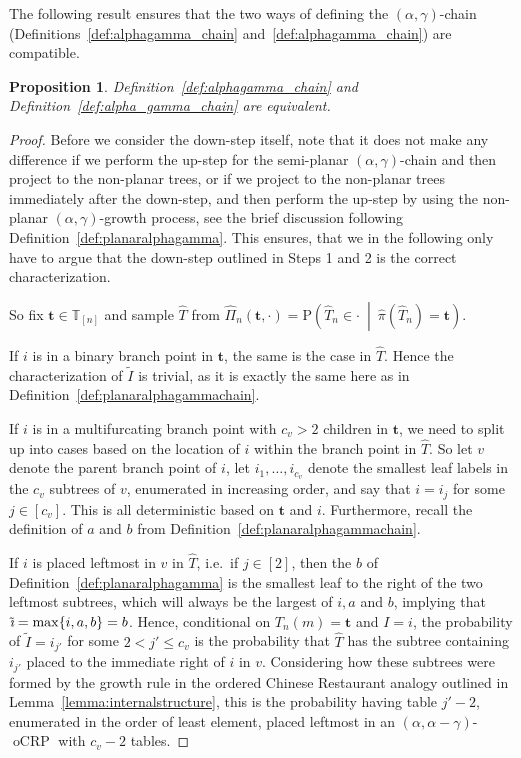 \documentclass[a4paper, final]{amsart}
\theoremstyle{plain}
\newtheorem{prop}[thm]{Proposition}
\theoremstyle{definition}
\newcommand{\tree}[1][t]{\boldsymbol{#1}}
\newcommand{\That}[1][T]{\widehat{#1}}
\newcommand{\T}{\mathbb{T}}
\DeclareMathOperator{\tildei}{\tilde{\textit{\i}}}
\DeclareMathOperator{\ocrp}{oCRP}
\renewcommand{\P}{\mathrm{P}}
\begin{document}
%
The following result ensures that the two ways of defining the $(\alpha, \gamma)$-chain (Definitions~\ref{def:alphagamma_chain} and~\ref{def:alphagamma_chain}) are compatible.
%
\begin{prop}%
\label{prop:nonplanar_alphagamma_chain}
Definition~\ref{def:alphagamma_chain} and Definition~\ref{def:alpha_gamma_chain} are equivalent.
\end{prop}
%
\begin{proof}
  Before we consider the down-step itself, note that it does not make any difference if we perform the up-step for the semi-planar $(\alpha, \gamma)$-chain and then project to the non-planar trees, or if we project to the non-planar trees immediately after the down-step, and then perform the up-step by using the non-planar $(\alpha, \gamma)$-growth process, see the brief discussion following Definition~\ref{def:planaralphagamma}.
  This ensures, that we in the following only have to argue that the down-step outlined in Steps 1 and 2 is the correct characterization. 

  So fix $\tree \in \T_{[n]}$ and sample $\That$ from $\hat{\Pi}_n \left( \tree, \cdot \right) = \P \left( \That_n \in \cdot \ \middle \vert \ \hat{\pi} \left( \That_n \right) = \tree \right)$.

  If $i$ is in a binary branch point in $\tree$, the same is the case in $\That$.
  Hence the characterization of $\tilde{I}$ is trivial, as it is exactly the same here as in Definition~\ref{def:planaralphagammachain}.

  If $i$ is in a multifurcating branch point with $c_v > 2$ children in $\tree$, we need to split up into cases based on the location of $i$ within the branch point in $\That$.
  So let $v$ denote the parent branch point of $i$, let $i_1, \ldots, i_{c_v}$ denote the smallest leaf labels in the $c_v$ subtrees of $v$, enumerated in increasing order, and say that $i = i_j$ for some $j \in [c_v]$.
  This is all deterministic based on $\tree$ and $i$.
  Furthermore, recall the definition of $a$ and $b$ from Definition~\ref{def:planaralphagammachain}.

  If $i$ is placed leftmost in $v$ in $\That$, i.e.\ if $j \in [2]$, then the $b$ of Definition~\ref{def:planaralphagamma} is the smallest leaf to the right of the two leftmost subtrees, which will always be the largest of $i, a$ and $b$, implying that $\tildei = \max \{i, a, b\} = b$.
  Hence, conditional on $T_n(m) = \tree$ and $I = i$, the probability of $\tilde{I} = i_{j'}$ for some $2 < j' \leq c_v$ is the probability that $\That$ has the subtree containing $i_{j'}$ placed to the immediate right of $i$ in $v$.
  Considering how these subtrees were formed by the growth rule in the ordered Chinese Restaurant analogy outlined in Lemma~\ref{lemma:internalstructure}, this is the probability having table $j' - 2$, enumerated in the order of least element, placed leftmost in an $(\alpha, \alpha - \gamma)$-$\ocrp$ with $c_v - 2$ tables.


\end{proof}
\end{document}
